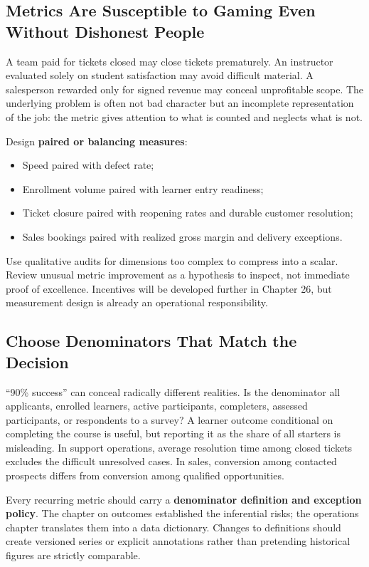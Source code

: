 \subsection{Metrics Are Susceptible to Gaming Even Without Dishonest People}
\label{sec:gaming_metrics}

A team paid for tickets closed may close tickets prematurely. An instructor evaluated solely on student satisfaction may avoid difficult material. A salesperson rewarded only for signed revenue may conceal unprofitable scope. The underlying problem is often not bad character but an incomplete representation of the job: the metric gives attention to what is counted and neglects what is not.

Design \textbf{paired or balancing measures}:
\begin{itemize}
    \item Speed paired with defect rate;
    \item Enrollment volume paired with learner entry readiness;
    \item Ticket closure paired with reopening rates and durable customer resolution;
    \item Sales bookings paired with realized gross margin and delivery exceptions.
\end{itemize}

Use qualitative audits for dimensions too complex to compress into a scalar. Review unusual metric improvement as a hypothesis to inspect, not immediate proof of excellence. Incentives will be developed further in Chapter 26, but measurement design is already an operational responsibility.

\subsection{Choose Denominators That Match the Decision}
\label{sec:denominators_matter}

``90\% success'' can conceal radically different realities. Is the denominator all applicants, enrolled learners, active participants, completers, assessed participants, or respondents to a survey? A learner outcome conditional on completing the course is useful, but reporting it as the share of all starters is misleading. In support operations, average resolution time among closed tickets excludes the difficult unresolved cases. In sales, conversion among contacted prospects differs from conversion among qualified opportunities.

Every recurring metric should carry a \textbf{denominator definition and exception policy}. The chapter on outcomes established the inferential risks; the operations chapter translates them into a data dictionary. Changes to definitions should create versioned series or explicit annotations rather than pretending historical figures are strictly comparable.

